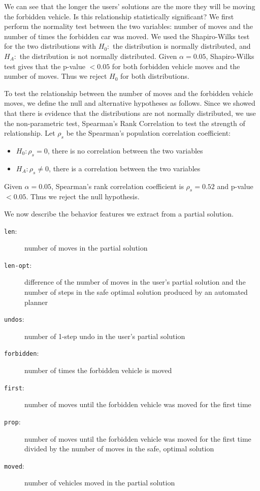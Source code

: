 \documentclass[doctor]{thesis} %
\theoremstyle{plain}
\begin{document}
We can see that the longer the users' solutions are the more they will be moving the forbidden vehicle. Is this relationship statistically significant? We first perform the normality test between the two variables: number of moves and the number of times the forbidden car was moved. We used the Shapiro-Wilks test for the two distributions with $H_0:$ the distribution is normally distributed, and $H_A:$ the distribution is not normally distributed. Given $\alpha=0.05$, Shapiro-Wilks test gives that the p-value $<0.05$ for both forbidden vehicle moves and the number of moves. Thus we reject $H_0$ for both distributions.

To test the relationship between the number of moves and the forbidden vehicle moves, we define the null and alternative hypotheses as follows. Since we showed that there is evidence that the distributions are not normally distributed, we use the non-parametric test, Spearman's Rank Correlation to test the strength of relationship. Let $\rho_s$ be the Spearman's population correlation coefficient:
\begin{itemize}
\item $H_0: \rho_s=0$, there is no correlation between the two variables
\item $H_A: \rho_s\neq0$, there is a correlation between the two variables
\end{itemize}
Given $\alpha=0.05$, Spearman's rank correlation coefficient is $\rho_s=0.52$ and p-value $<0.05$. Thus we reject the null hypothesis.

We now describe the behavior features we extract from a partial solution.
\begin{description}
\item[\texttt{len}:] number of moves in the partial solution
\item[\texttt{len-opt}:] difference of the number of moves in the user's partial solution and the number of steps in the safe optimal solution produced by an automated planner
\item[\texttt{undos}:] number of 1-step undo in the user's partial solution
\item[\texttt{forbidden}:] number of times the forbidden vehicle is moved
\item[\texttt{first}:] number of moves until the forbidden vehicle was moved for the first time
\item[\texttt{prop}:] number of moves until the forbidden vehicle was moved for the first time divided by the number of moves in the safe, optimal solution
\item[\texttt{moved}:] number of vehicles moved in the partial solution
\end{description}
\end{document}
